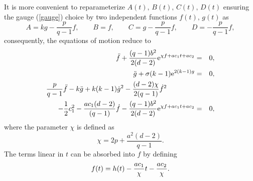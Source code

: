 \documentclass[a4paper,aps,nofootinbib,showpacs,preprint]{revtex4}
\begin{document}
It is more convenient to reparameterize $A(t),\, B(t),\, C(t),\,
D(t)$ ensuring the gauge (\ref{gauge}) choice by two independent
functions $f(t),\, g(t)$ as
\begin{equation}
A = k g - \frac{p}{q-1} f, \qquad B = f, \qquad C = g -
\frac{p}{q-1} f, \qquad D = -\frac{p}{q-1} f, \label{abcdrel}
\end{equation}
consequently, the equations of motion reduce to
\begin{eqnarray}
\ddot f + \frac{(q-1)b^2}{2(d-2)} {\rm e}^{\chi f + a c_1 t + a
c_2} &=& 0, \label{Eqf} \\
\ddot g + \sigma (k-1) {\rm e}^{2(k-1) g} &=& 0, \label{Eqg} \\
\frac{p}{q-1} \ddot f - k \ddot g + k(k-1) \dot g^2 - \frac{(d-2)
\chi}{2(q-1)} \dot f^2 \qquad\qquad && \nonumber\\
- {1\over 2} c_1^2 - {a c_1 (d-2) \over (q-1)} \dot f -
\frac{(q-1) b^2}{2(d-2)} {\rm e}^{\chi f+ a c_1 t+ a c_2} &=& 0,
\label{EqMix}
\end{eqnarray}
where the parameter $\chi$ is defined as
\begin{equation}
\chi = 2 p + \frac{a^2(d-2)}{q-1}.
\end{equation}
The terms linear in $t$ can be absorbed into $f$ by defining
\begin{equation}
f(t) = h(t) - {a c_1 \over \chi} t - {a c_2\over \chi}.
\end{equation}
\end{document}
